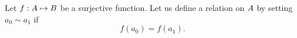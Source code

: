 \documentclass[../main.tex]{subfiles}
\begin{document}
\problem{}\label{s3p4}

Let \({f}: {{A}} \mapsto{} {{B}}\) be a surjective function. Let us
define a relation on \({A}\) by setting \({a_0} \sim {a_1}\) if
\[f({a_0}) = f({a_1}).\]



\end{document}
